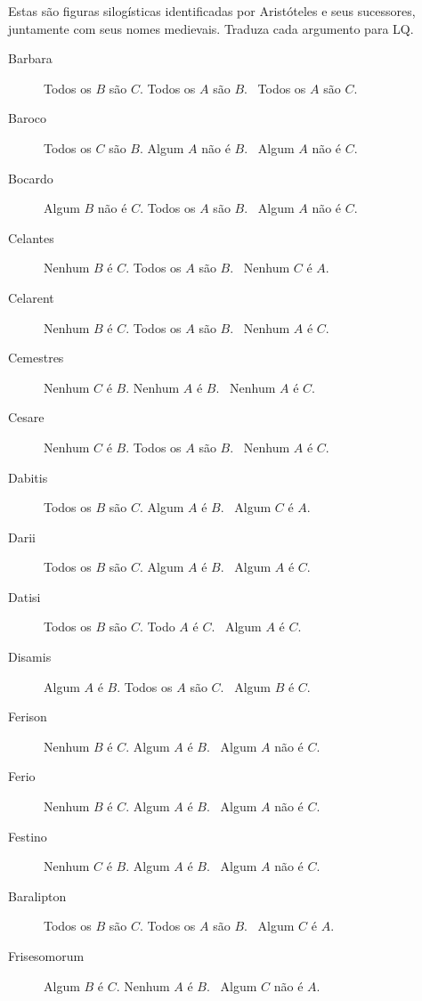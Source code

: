 \problempart
\label{pr.BarbaraEtc}
Estas são figuras silogísticas identificadas por Aristóteles e seus sucessores, juntamente com seus nomes medievais. Traduza cada argumento para LQ.
\begin{description}
\item[Barbara] Todos os $B$ são $C$. Todos os $A$ são $B$.
	\therefore\  Todos os $A$ são $C$.
\item[Baroco] Todos os $C$ são $B$. Algum $A$ não é $B$.
	\therefore\  Algum $A$ não é $C$.
\item[Bocardo] Algum $B$ não é $C$. Todos os $A$ são $B$.
	\therefore\  Algum $A$ não é $C$.
\item[Celantes] Nenhum $B$ é $C$. Todos os $A$ são $B$.
	\therefore\  Nenhum $C$ é $A$.
\item[Celarent] Nenhum $B$ é $C$. Todos os $A$ são $B$.
	\therefore\  Nenhum $A$ é $C$.
\item[Cemestres] Nenhum $C$ é $B$. Nenhum $A$ é $B$.
	\therefore\  Nenhum $A$ é $C$.
\item[Cesare] Nenhum $C$ é $B$. Todos os $A$ são $B$.
	\therefore\  Nenhum $A$ é $C$.
\item[Dabitis] Todos os $B$ são $C$. Algum $A$ é $B$.
	\therefore\  Algum $C$ é $A$.
\item[Darii] Todos os $B$ são $C$. Algum $A$ é $B$.
	\therefore\  Algum $A$ é $C$.
\item[Datisi] Todos os $B$ são $C$. Todo $A$ é $C$.
	\therefore\  Algum $A$ é $C$.
\item[Disamis] Algum $A$ é $B$. Todos os $A$ são $C$.
	\therefore\  Algum $B$ é $C$.
\item[Ferison] Nenhum $B$ é $C$. Algum $A$ é $B$.
	\therefore\  Algum $A$ não é $C$.
\item[Ferio] Nenhum $B$ é $C$. Algum $A$ é $B$.
	\therefore\  Algum $A$ não é $C$.
\item[Festino] Nenhum $C$ é $B$. Algum $A$ é $B$.
	\therefore\  Algum $A$ não é $C$.
\item[Baralipton] Todos os $B$ são $C$. Todos os $A$ são $B$.
	\therefore\  Algum $C$ é $A$.
\item[Frisesomorum] Algum $B$ é $C$. Nenhum $A$ é $B$.
	\therefore\  Algum $C$ não é $A$.
\end{description}




